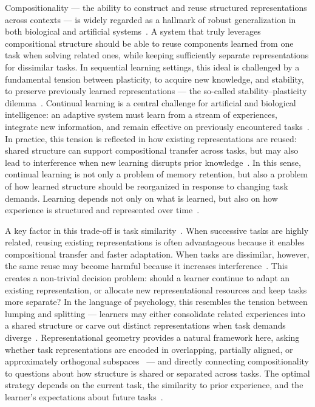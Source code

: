 \documentclass{article}
\theoremstyle{plain}
\theoremstyle{definition}
\theoremstyle{remark}
\begin{document}
Compositionality --- the ability to construct and reuse structured representations across
contexts --- is widely regarded as a hallmark of robust generalization in both biological
and artificial systems~\cite{salatiello2026modularitybedrocknaturalartificial}. A system
that truly leverages compositional structure should be able to reuse components learned
from one task when solving related ones, while keeping sufficiently separate representations
for dissimilar tasks. In sequential learning settings, this ideal is challenged by a
fundamental tension between plasticity, to acquire new knowledge, and stability, to preserve
previously learned representations --- the so-called stability--plasticity
dilemma~\cite{holton2025humans}. Continual learning is a central challenge for artificial
and biological intelligence: an adaptive system must learn from a stream of experiences,
integrate new information, and remain effective on previously encountered
tasks~\cite{ramasesh2020anatomy}. In practice, this tension is reflected in how existing
representations are reused: shared structure can support compositional transfer across
tasks, but may also lead to interference when new learning disrupts prior
knowledge~\cite{lee2021continual, liu2023connectivity, mathis2025leveraging}.
In this sense, continual learning is not only a problem of memory retention, but also
a problem of how learned structure should be reorganized in response to changing task
demands. Learning depends not only on what is learned, but also on how experience is
structured and represented over time~\cite{menghi2025impact}.

A key factor in this trade-off is task similarity~\cite{menghi2025effects}. When
successive tasks are highly related, reusing existing representations is often advantageous
because it enables compositional transfer and faster adaptation. When tasks are dissimilar,
however, the same reuse may become harmful because it increases
interference~\cite{hiratani2024disentangling}. This creates a non-trivial decision problem:
should a learner continue to adapt an existing representation, or allocate new
representational resources and keep tasks more separate? In the language of psychology,
this resembles the tension between lumping and splitting --- learners may either consolidate
related experiences into a shared structure or carve out distinct representations when task
demands diverge~\cite{holton2025humans}. Representational geometry provides a natural
framework here, asking whether task representations are encoded in overlapping, partially
aligned, or approximately orthogonal subspaces~\cite{kriegeskorte2013representational} ---
and directly connecting compositionality to questions about how structure is shared or
separated across tasks. The optimal strategy depends on the current task, the similarity
to prior experience, and the learner's expectations about future tasks~\cite{holton2025humans}.
\end{document}
